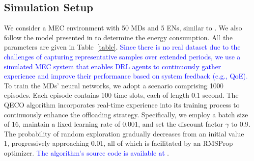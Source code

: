 \documentclass[10pt, journal,letterpaper]{IEEEtran}
\begin{document}



\subsection{Simulation Setup}
We consider a MEC environment with 50 MDs and 5 ENs, similar to \cite{9253665}. We also follow the model presented in \cite{zhou2021deep} to determine the energy consumption. All the parameters are given in Table~\ref{table}. \textcolor{blue}{Since there is no real dataset due to the challenges of capturing representative samples over extended periods, we use a simulated MEC system that enables DRL agents to continuously gather experience and improve their performance based on system feedback (e.g., QoE).} To train the MDs' neural networks, we adopt a scenario comprising 1000 episodes. Each episode contains 100 time slots, each of length 0.1 second. The QECO algorithm incorporates real-time experience into its training process to continuously enhance the offloading strategy. Specifically, we employ a batch size of 16, maintain a fixed learning rate of 0.001, and set the discount factor $\gamma$ to 0.9. The probability of random exploration gradually decreases from an initial value 1, progressively approaching 0.01, all of which is facilitated by an RMSProp optimizer. \textcolor{blue}{The algorithm's source code is available at \cite{QECO}}.
	
	
	
\end{document}
